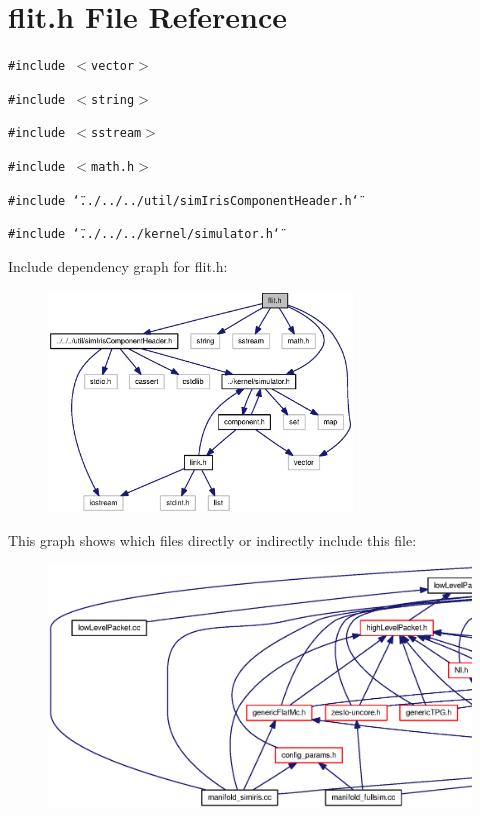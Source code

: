 \section{flit.h File Reference}
\label{flit_8h}
{\tt \#include $<$vector$>$}\par
{\tt \#include $<$string$>$}\par
{\tt \#include $<$sstream$>$}\par
{\tt \#include $<$math.h$>$}\par
{\tt \#include \char`\"{}../../../util/simIrisComponentHeader.h\char`\"{}}\par
{\tt \#include \char`\"{}../../../kernel/simulator.h\char`\"{}}\par


Include dependency graph for flit.h:\nopagebreak
\begin{figure}[H]
\begin{center}
\leavevmode
\includegraphics[width=229pt]{flit_8h__incl}
\end{center}
\end{figure}


This graph shows which files directly or indirectly include this file:\nopagebreak
\begin{figure}[H]
\begin{center}
\leavevmode
\includegraphics[width=420pt]{flit_8h__dep__incl}
\end{center}
\end{figure}
